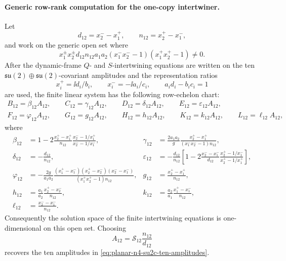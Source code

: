 \paragraph{Generic row-rank computation for the one-copy intertwiner.}
Let
\[
  d_{12}=x_2^- -x_1^+,\qquad n_{12}=x_2^+ -x_1^-,
\]
and work on the generic open set where
\[
  x_1^\pm x_2^\pm d_{12}n_{12}a_1a_2
  (x_1^-x_2^- -1)(x_1^+x_2^+ -1)\ne0 .
\]
After the dynamic-frame \(Q\)- and \(S\)-intertwining equations are written
on the ten \(\mathfrak{su}(2)\oplus\mathfrak{su}(2)\)-covariant amplitudes
and the representation ratios
\[
  x_i^+=\ii d_i/b_i,\qquad x_i^-=-\ii a_i/c_i,\qquad a_id_i-b_ic_i=1
\]
are used, the finite linear system has the following row-echelon chart:
\begin{equation}
\begin{gathered}
  B_{12}=\beta_{12}A_{12},\qquad
  C_{12}=\gamma_{12}A_{12},\qquad
  D_{12}=\delta_{12}A_{12},\qquad
  E_{12}=\varepsilon_{12}A_{12},\\
  F_{12}=\varphi_{12}A_{12},\qquad
  G_{12}=g_{12}A_{12},\qquad
  H_{12}=h_{12}A_{12},\qquad
  K_{12}=k_{12}A_{12},\qquad
  L_{12}=\ell_{12}A_{12},
\end{gathered}
\label{eq:planar-n4-su2c-row-chart}
\end{equation}
where
\begin{equation}
\begin{aligned}
  \beta_{12}
  &=
  1
  -2\frac{x_2^+-x_1^+}{n_{12}}
     \frac{x_2^- -1/x_1^+}{x_2^- -1/x_1^-},
  &
  \gamma_{12}
  &=
  \frac{2a_1a_2}{g}
  \frac{x_2^+-x_1^+}{(x_1^-x_2^- -1)n_{12}},
  \\
  \delta_{12}
  &=-\frac{d_{12}}{n_{12}},
  &
  \varepsilon_{12}
  &=
  -\frac{d_{12}}{n_{12}}
  \left[
  1
  -2\frac{x_2^- -x_1^-}{d_{12}}
     \frac{x_2^+ -1/x_1^-}{x_2^+ -1/x_1^+}
  \right],
  \\
  \varphi_{12}
  &=
  -\frac{2g}{a_1a_2}
  \frac{(x_1^+-x_1^-)(x_2^+-x_2^-)(x_2^- -x_1^-)}
       {(x_1^+x_2^+ -1)n_{12}},
  &
  g_{12}
  &=
  \frac{x_2^+-x_1^+}{n_{12}},
  \\
  h_{12}
  &=
  \frac{a_1}{a_2}\frac{x_2^+-x_2^-}{n_{12}},
  &
  k_{12}
  &=
  \frac{a_2}{a_1}\frac{x_1^+-x_1^-}{n_{12}},
  \\
  \ell_{12}
  &=
  \frac{x_2^- -x_1^-}{n_{12}} .
\end{aligned}
\label{eq:planar-n4-su2c-row-coefficients}
\end{equation}
Consequently the solution space of the finite intertwining equations is
one-dimensional on this open set.  Choosing
\[
  A_{12}=\mathcal S_{12}\frac{n_{12}}{d_{12}}
\]
recovers the ten amplitudes in
\eqref{eq:planar-n4-su2c-ten-amplitudes}.

